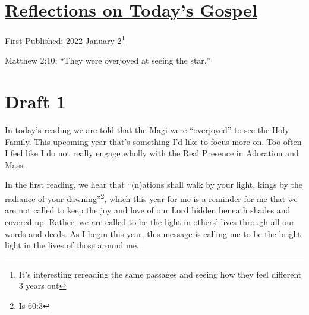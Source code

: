 \documentclass[12pt]{article}[titlepage]
\newcommand{\say}[1]{``#1''}
\newcommand{\1}{\={a}}
\newcommand{\2}{\={e}}
\newcommand{\3}{\={\i}}
\newcommand{\4}{\=o}
\newcommand{\5}{\=u}
\newcommand{\6}{\={A}}
\renewcommand{\,}{\textsuperscript{,}}
\begin{document}
\doublespacing
\section{\href{reflections-on-readings-epiphany-c-2022.html}{Reflections on Today's Gospel}}
First Published: 2022 January 2\footnote{It's interesting rereading the same passages and seeing how they feel different 3 years out}

Matthew 2:10: \say{They were overjoyed at seeing the star,}

\section{Draft 1}
In today's reading we are told that the Magi were \say{overjoyed} to see the Holy Family.
This upcoming year that's something I'd like to focus more on.
Too often I feel like I do not really engage wholly with the Real Presence in Adoration and Mass.

In the first reading, we hear that \say{(n)ations shall walk by your light, kings by the radiance of your dawning}\footnote{Is 60:3}, which this year for me is a reminder for me that we are not called to keep the joy and love of our Lord hidden beneath shades and covered up.
Rather, we are called to be the light in others' lives through all our words and deeds.
As I begin this year, this message is calling me to be the bright light in the lives of those around me.
\end{document}
